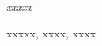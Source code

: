 \newpage 
\thispagestyle{empty}

\begin{abstractES}
{\em
xxxxx
}

\begin{keyWordsES}
xxxxx, xxxx, xxxx
\end{keyWordsES}

\end{abstractES}